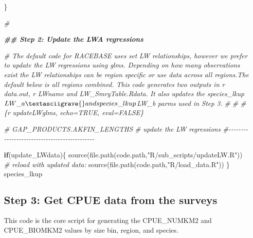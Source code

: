 \documentclass[
]{article}
\newenvironment{Shaded}{\begin{snugshade}}{\end{snugshade}}
\newcommand{\CommentTok}[1]{\textcolor[rgb]{0.56,0.35,0.01}{\textit{#1}}}
\newcommand{\ControlFlowTok}[1]{\textcolor[rgb]{0.13,0.29,0.53}{\textbf{#1}}}
\newcommand{\DocumentationTok}[1]{\textcolor[rgb]{0.56,0.35,0.01}{\textbf{\textit{#1}}}}
\newcommand{\FunctionTok}[1]{\textcolor[rgb]{0.00,0.00,0.00}{#1}}
\newcommand{\NormalTok}[1]{#1}
\newcommand{\StringTok}[1]{\textcolor[rgb]{0.31,0.60,0.02}{#1}}
\begin{document}
\begin{Shaded}
\begin{Highlighting}[]
\NormalTok{  \}}

    
\CommentTok{\#\textasciigrave{}\textasciigrave{}\textasciigrave{}}


\DocumentationTok{\#\# Step 2: Update the LWA regressions}

\CommentTok{\# The default code for RACEBASE uses set LW relationships, however we prefer to update the LW regressions using glms. Depending on how many observations exist the LW relationships can be region specific or use data across all regions.The default below is all regions combined. This code generates two outputs in \textasciigrave{}r data.out\textasciigrave{}, \textasciigrave{}r LWname\textasciigrave{} and \textasciigrave{}LW\_SmryTable.Rdata\textasciigrave{}. It also updates the \textasciigrave{}species\_lkup$LW\_a\textasciigrave{} and species\_lkup$LW\_b\textasciigrave{} parms used in Step 3.}
\CommentTok{\# }
\CommentTok{\# \#\textasciigrave{}\textasciigrave{}\textasciigrave{}\{r updateLWglms, echo=TRUE, eval=FALSE\}    }

  \CommentTok{\# GAP\_PRODUCTS.AKFIN\_LENGTHS}
  \CommentTok{\# update the LW regressions }
  \CommentTok{\#{-}{-}{-}{-}{-}{-}{-}{-}{-}{-}{-}{-}{-}{-}{-}{-}{-}{-}{-}{-}{-}{-}{-}{-}{-}{-}{-}{-}{-}{-}{-}{-}{-}{-}{-}{-}{-}{-}{-}{-}{-}{-}{-}{-}{-}  }

  \ControlFlowTok{if}\NormalTok{(update\_LWdata)\{    }
     \FunctionTok{source}\NormalTok{(}\FunctionTok{file.path}\NormalTok{(code.path,}\StringTok{"R/sub\_scripts/updateLW.R"}\NormalTok{))}
     \CommentTok{\# reload with updated data:}
     \FunctionTok{source}\NormalTok{(}\FunctionTok{file.path}\NormalTok{(code.path,}\StringTok{"R/load\_data.R"}\NormalTok{))}
\NormalTok{  \}}
\NormalTok{  species\_lkup}
\end{Highlighting}
\end{Shaded}

\hypertarget{step-3-get-cpue-data-from-the-surveys}{%
\subsection{Step 3: Get CPUE data from the
surveys}\label{step-3-get-cpue-data-from-the-surveys}}

This code is the core script for generating the CPUE\_NUMKM2 and
CPUE\_BIOMKM2 values by size bin, region, and species.
\end{document}
